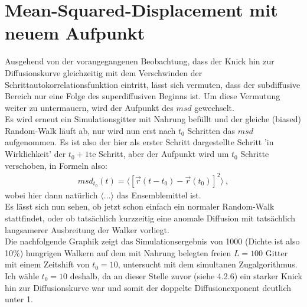\documentclass[a4paper, 12pt]{report}
\begin{document}
\section{Mean-Squared-Displacement mit neuem Aufpunkt}
Ausgehend von der vorangegangenen Beobachtung, dass der Knick hin zur Diffusionskurve gleichzeitig mit dem Verschwinden der Schrittautokorrelationsfunktion eintritt, lässt sich vermuten, dass der subdiffusive Bereich nur eine Folge des superdiffusiven Beginns ist. Um diese Vermutung weiter zu untermauern, wird der Aufpunkt des $msd$ gewechselt.
\\
Es wird erneut ein Simulationsgitter mit Nahrung befüllt und der gleiche (biased) Random-Walk läuft ab, nur wird nun erst nach $t_0$ Schritten das $msd$ aufgenommen. Es ist also der hier als erster Schritt dargestellte Schritt 'in Wirklichkeit' der $t_0+1$te Schritt, aber der Aufpunkt wird um $t_0$ Schritte verschoben, in Formeln also:
\begin{align}
msd_{t_0}(t) = \langle \left[\vec{r}(t-t_0)-\vec{r}(t_0)\right]^2\rangle\ ,
\end{align}
wobei hier dann natürlich $\langle ... \rangle$ das Ensemblemittel ist.
\\
Es lässt sich nun sehen, ob jetzt schon einfach ein normaler Random-Walk stattfindet, oder ob tatsächlich kurzzeitig eine anomale Diffusion mit tatsächlich langsamerer Ausbreitung der Walker vorliegt.
\\
Die nachfolgende Graphik zeigt das Simulationsergebnis von 1000 (Dichte ist also 10\%) hungrigen Walkern auf dem mit Nahrung belegten freien $L=100$ Gitter mit einem Zeitshift von $t_0=10$, untersucht mit dem simultanen Zugalgorithmus. Ich wähle $t_0=10$ deshalb, da an dieser Stelle zuvor (siehe 4.2.6) ein starker Knick hin zur Diffusionskurve war und somit der doppelte Diffusionexponent deutlich unter 1.
\end{document}
